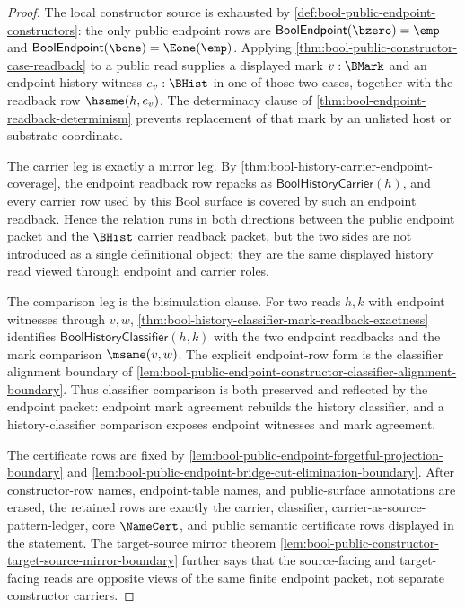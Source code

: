 \begin{proof}
The local constructor source is exhausted by \autoref{def:bool-public-endpoint-constructors}: the only public endpoint rows are $\mathsf{BoolEndpoint}(\bzero)=\emp$ and $\mathsf{BoolEndpoint}(\bone)=\Eone(\emp)$. Applying \autoref{thm:bool-public-constructor-case-readback} to a public read supplies a displayed mark $v:\BMark$ and an endpoint history witness $e_v:\BHist$ in one of those two cases, together with the readback row $\hsame(h,e_v)$. The determinacy clause of \autoref{thm:bool-endpoint-readback-determinism} prevents replacement of that mark by an unlisted host or substrate coordinate.

The carrier leg is exactly a mirror leg. By \autoref{thm:bool-history-carrier-endpoint-coverage}, the endpoint readback row repacks as $\mathsf{BoolHistoryCarrier}(h)$, and every carrier row used by this Bool surface is covered by such an endpoint readback. Hence the relation runs in both directions between the public endpoint packet and the $\BHist$ carrier readback packet, but the two sides are not introduced as a single definitional object; they are the same displayed history read viewed through endpoint and carrier roles.

The comparison leg is the bisimulation clause. For two reads $h,k$ with endpoint witnesses through $v,w$, \autoref{thm:bool-history-classifier-mark-readback-exactness} identifies $\mathsf{BoolHistoryClassifier}(h,k)$ with the two endpoint readbacks and the mark comparison $\msame(v,w)$. The explicit endpoint-row form is the classifier alignment boundary of \autoref{lem:bool-public-endpoint-constructor-classifier-alignment-boundary}. Thus classifier comparison is both preserved and reflected by the endpoint packet: endpoint mark agreement rebuilds the history classifier, and a history-classifier comparison exposes endpoint witnesses and mark agreement.

The certificate rows are fixed by \autoref{lem:bool-public-endpoint-forgetful-projection-boundary} and \autoref{lem:bool-public-endpoint-bridge-cut-elimination-boundary}. After constructor-row names, endpoint-table names, and public-surface annotations are erased, the retained rows are exactly the carrier, classifier, carrier-as-source-pattern-ledger, core $\NameCert$, and public semantic certificate rows displayed in the statement. The target-source mirror theorem \autoref{lem:bool-public-constructor-target-source-mirror-boundary} further says that the source-facing and target-facing reads are opposite views of the same finite endpoint packet, not separate constructor carriers.


\end{proof}
